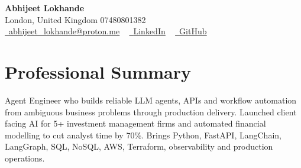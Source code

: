 \documentclass[a4paper,10pt]{article}
\begin{document}
    \begin{center}
        {\Huge\bfseries Abhijeet Lokhande}
        \\[2pt] {\color{muted}London, United Kingdom \textbar{} 07480801382}\\
        \small
        \href{mailto:abhijeet_lokhande@proton.me}{\raisebox{-0.2\height}{\color{primary}\faEnvelope}\  \underline{abhijeet\_lokhande@proton.me}} ~
        \href{https://www.linkedin.com/in/ablds/}{\raisebox{-0.2\height}{\color{primary}\faLinkedin}\ \underline{LinkedIn}}  ~
        \href{https://github.com/abhijeetscode}{\raisebox{-0.2\height}{\color{primary}\faGithub}\ \underline{GitHub}}
    \end{center}

\section{Professional Summary}
\vspace{-5pt}
{\color{muted}Agent Engineer who builds reliable LLM agents, APIs and workflow automation from ambiguous business problems through production delivery. Launched client facing AI for 5+ investment management firms and automated financial modelling to cut analyst time by 70\%. Brings Python, FastAPI, LangChain, LangGraph, SQL, NoSQL, AWS, Terraform, observability and production operations.}
\vspace{2pt}

\end{document}
